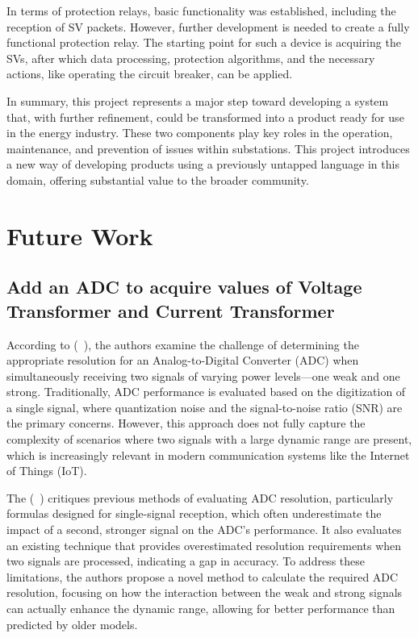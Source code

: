 In terms of protection relays, basic functionality was established, including the reception of SV packets. However, further development is needed to create a fully functional protection relay. The starting point for such a device is acquiring the SVs, after which data processing, protection algorithms, and the necessary actions, like operating the circuit breaker, can be applied.

In summary, this project represents a major step toward developing a system that, with further refinement, could be transformed into a product ready for use in the energy industry. These two components play key roles in the operation, maintenance, and prevention of issues within substations. This project introduces a new way of developing products using a previously untapped language in this domain, offering substantial value to the broader community.

\section{Future Work}

\subsection{Add an ADC to acquire values of Voltage Transformer and Current Transformer}

According to (~\cite{laporte2024adc}), the authors examine the challenge of determining the appropriate resolution for an Analog-to-Digital Converter (ADC) when simultaneously receiving two signals of varying power levels—one weak and one strong. Traditionally, ADC performance is evaluated based on the digitization of a single signal, where quantization noise and the signal-to-noise ratio (SNR) are the primary concerns. However, this approach does not fully capture the complexity of scenarios where two signals with a large dynamic range are present, which is increasingly relevant in modern communication systems like the Internet of Things (IoT).

The (~\cite{laporte2024adc}) critiques previous methods of evaluating ADC resolution, particularly formulas designed for single-signal reception, which often underestimate the impact of a second, stronger signal on the ADC’s performance. It also evaluates an existing technique that provides overestimated resolution requirements when two signals are processed, indicating a gap in accuracy. To address these limitations, the authors propose a novel method to calculate the required ADC resolution, focusing on how the interaction between the weak and strong signals can actually enhance the dynamic range, allowing for better performance than predicted by older models.

